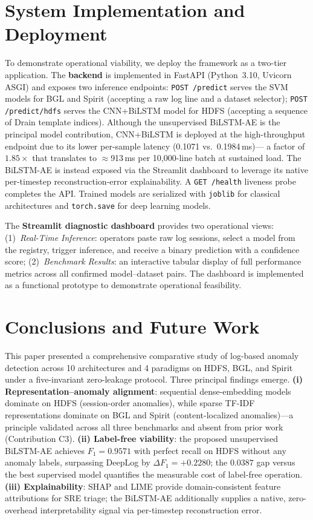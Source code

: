 \documentclass{elektr}
\begin{document}
\section{System Implementation and Deployment}
\label{Sec:Deployment}

To demonstrate operational viability, we deploy the framework as a two-tier
application. The \textbf{backend} is implemented in FastAPI (Python~3.10,
Uvicorn ASGI) and exposes two inference endpoints: \texttt{POST /predict}
serves the SVM models for BGL and Spirit (accepting a raw log line and a
dataset selector); \texttt{POST /predict/hdfs} serves the CNN+BiLSTM model
for HDFS (accepting a sequence of Drain template indices). Although the unsupervised
BiLSTM-AE is the principal model contribution, CNN+BiLSTM is deployed at the
high-throughput endpoint due to its lower per-sample latency (0.1071 vs.\ 0.1984\,ms)---
a factor of $1.85\times$ that translates to $\approx$913\,ms per 10{,}000-line batch
at sustained load. The BiLSTM-AE is instead exposed via the Streamlit dashboard
to leverage its native per-timestep reconstruction-error explainability.
A \texttt{GET /health} liveness probe completes the API. Trained models are
serialized with \texttt{joblib} for classical architectures and \texttt{torch.save}
for deep learning models.

The \textbf{Streamlit diagnostic dashboard} provides two operational views:
(1)~\textit{Real-Time Inference}: operators paste raw log sessions, select a model from the registry, trigger inference, and receive a binary prediction with a confidence score;
(2)~\textit{Benchmark Results}: an interactive tabular display of full performance metrics across all confirmed model--dataset pairs.
The dashboard is implemented as a functional prototype to demonstrate operational feasibility.

\section{Conclusions and Future Work}
\label{Sec:Conclusion}

This paper presented a comprehensive comparative study of log-based anomaly
detection across 10 architectures and 4 paradigms on HDFS, BGL, and Spirit under
a five-invariant zero-leakage protocol. Three principal findings emerge.
\textbf{(i) Representation--anomaly alignment}: sequential dense-embedding models
dominate on HDFS (session-order anomalies), while sparse TF-IDF representations
dominate on BGL and Spirit (content-localized anomalies)---a principle validated
across all three benchmarks and absent from prior work (Contribution C3).
\textbf{(ii) Label-free viability}: the proposed unsupervised BiLSTM-AE achieves
$F_1{=}0.9571$ with perfect recall on HDFS without any anomaly labels, surpassing
DeepLog by $\Delta F_1{=}+0.2280$; the $0.0387$ gap versus the best supervised
model quantifies the measurable cost of label-free operation.
\textbf{(iii) Explainability}: SHAP and LIME provide domain-consistent feature
attributions for SRE triage; the BiLSTM-AE additionally supplies a native,
zero-overhead interpretability signal via per-timestep reconstruction error.
\end{document}
